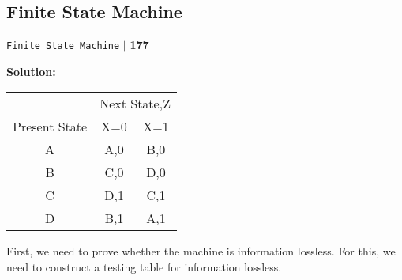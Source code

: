 \documentclass[a4,9pt]{beamer}
\begin{document}
\begin{frame}
\section*{Finite State Machine}
\begin{flushright}
\texttt{Finite State Machine} \hspace*{0.1cm}\textbf{$|$} \hspace*{0.1cm} \textbf{177}\hspace*{0.1cm}
\end{flushright}
\vspace*{1cm}

\large{\textbf{Solution:}}

\pause
\begin{center}
\begin{tabular}{ccc}
 \hline

 \hline

 \hline

 \hline
 & \multicolumn{2}{c}{Next State,Z}\\
 \cline{2-3}
Present State & X=0           &   X=1\\
\hline
    A    &  A,0  & B,0 \\
    B    &  C,0  & D,0 \\
    C    &  D,1  & C,1 \\
    D    &  B,1  & A,1 \\
 \hline

 \hline

 \hline

 \hline
\end{tabular}
\end{center}

\pause
First, we need to prove whether the machine is information lossless. For this, we need to construct a testing table for information lossless.
\end{frame}
\end{document}
